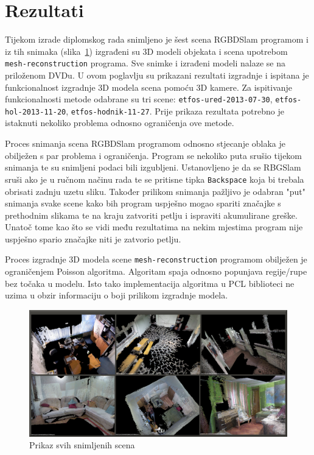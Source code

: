 \newpage
\setcounter{figure}{0}

\section{Rezultati} %
\label{sec:Rezultati}

Tijekom izrade diplomskog rada snimljeno je šest scena RGBDSlam
programom i iz tih snimaka (slika~\ref{fig:01-all.png}) izgrađeni su 3D
modeli objekata i scena upotrebom \texttt{mesh-reconstruction} programa.
Sve snimke i izrađeni modeli nalaze se na priloženom DVDu. U ovom
poglavlju su prikazani rezultati izgradnje i ispitana je funkcionalnost
izgradnje 3D modela scena pomoću 3D kamere.  Za ispitivanje
funkcionalnosti metode odabrane su tri scene:
\texttt{etfos-ured-2013-07-30}, \texttt{etfos-hol-2013-11-20},
\texttt{etfos-hodnik-11-27}. Prije prikaza rezultata potrebno je
istaknuti nekoliko problema odnosno ograničenja ove metode.

Proces snimanja scena RGBDSlam programom odnosno stjecanje oblaka je
obilježen s par problema i ograničenja. Program se nekoliko puta srušio
tijekom snimanja te su snimljeni podaci bili izgubljeni. Ustanovljeno je
da se RBGSlam sruši ako je u ručnom načinu rada te se pritisne tipka
\texttt{Backspace} koja bi trebala obrisati zadnju uzetu sliku. Također
prilikom snimanja pažljivo je odabran "put" snimanja svake scene kako
bih program uspješno mogao spariti značajke s prethodnim slikama te na
kraju zatvoriti petlju i ispraviti akumulirane greške. Unatoč tome kao
što se vidi među rezultatima na nekim mjestima program nije uspješno
spario značajke niti je zatvorio petlju.

Proces izgradnje 3D modela scene \texttt{mesh-reconstruction} programom
obilježen je ograničenjem Poisson algoritma. Algoritam spaja odnosno
popunjava regije/rupe bez točaka u modelu. Isto tako implementacija
algoritma u PCL biblioteci ne uzima u obzir informaciju o boji prilikom
izgradnje modela.

\begin{figure}[h]
\centering
\includegraphics[scale=0.20]{figures/01-all-pcd.png}
\caption{Prikaz svih snimljenih scena}
\label{fig:01-all.png}
\end{figure}

